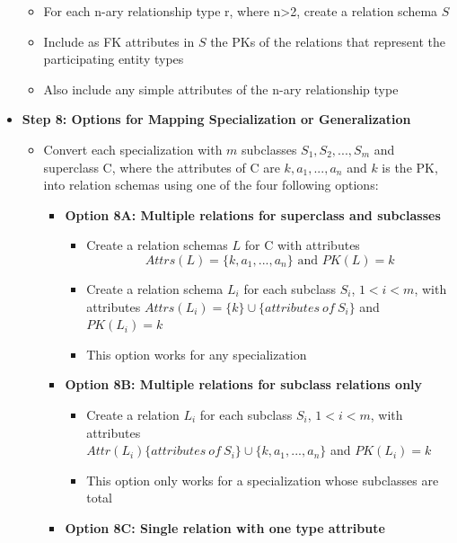 \begin{itemize}[label=\(\rhd\)]
    \begin{itemize}[label=\(\rhd\)]
        \item For each n-ary relationship type r, where n>2, create a relation schema $S$
        \item Include as FK attributes in $S$ the PKs of the relations that represent the participating entity types
        \item Also include any simple attributes of the n-ary relationship type
    \end{itemize}
    \item \textbf{Step 8: Options for Mapping Specialization or Generalization}
    \begin{itemize}[label=\(\rhd\)]
        \item Convert each specialization with $m$ subclasses $S_1,S_2,...,S_m$ and superclass C, where the attributes of C are $k,a_1,...,a_n$ and $k$ is the PK, into relation schemas using one of the four following options:
        \begin{itemize}[label=\(\rhd\)]
            \item \textbf{Option 8A: Multiple relations for superclass and subclasses}
            \begin{itemize}[label=\(\rhd\)]
                \item Create a relation schemas $L$ for C with attributes \[Attrs(L)=\{k,a_1,...,a_n\} \text{ and } PK(L)=k\]
                \item Create a relation schema $L_i$ for each subclass $S_i$, $1<i<m$, with attributes $Attrs(L_i)=\{k\} \cup \{attributes\ of\ S_i\}$ and $PK(L_i)=k$
                \item This option works for any specialization
            \end{itemize}
            \item \textbf{Option 8B: Multiple relations for subclass relations only}
            \begin{itemize}[label=\(\rhd\)]
                \item Create a relation $L_i$ for each subclass $S_i$, $1<i<m$, with attributes\\ $Attr(L_i)\{attributes\ of\ S_i\} \cup \{k,a_1,...,a_n\}$ and $PK(L_i)=k$
                \item This option only works for a specialization whose subclasses are total
            \end{itemize}
            \item \textbf{Option 8C: Single relation with one type attribute}

\end{itemize}
\end{itemize}
\end{itemize}
